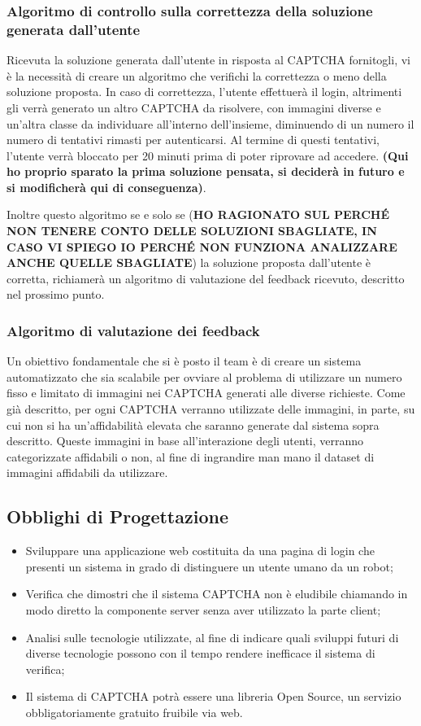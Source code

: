 \subsubsection{Algoritmo di controllo sulla correttezza della soluzione generata dall'utente}
Ricevuta la soluzione generata dall'utente in risposta al CAPTCHA fornitogli, vi è la necessità di creare un algoritmo che verifichi la correttezza o meno della soluzione proposta. In caso di correttezza, l'utente effettuerà il login, altrimenti gli verrà generato un altro CAPTCHA da risolvere, con immagini diverse e un'altra classe da individuare all'interno dell'insieme, diminuendo di un numero il numero di tentativi rimasti per autenticarsi. Al termine di questi tentativi, l'utente verrà bloccato per 20 minuti prima di poter riprovare ad accedere. \textbf{(Qui ho proprio sparato la prima soluzione pensata, si deciderà in futuro e si modificherà qui di conseguenza)}.

Inoltre questo algoritmo se e solo se (\textbf{HO RAGIONATO SUL PERCHÉ NON TENERE CONTO DELLE SOLUZIONI SBAGLIATE, IN CASO VI SPIEGO IO PERCHÉ NON FUNZIONA ANALIZZARE ANCHE QUELLE SBAGLIATE}) la soluzione proposta dall'utente è corretta, richiamerà un algoritmo di valutazione del feedback ricevuto, descritto nel prossimo punto.

\subsubsection{Algoritmo di valutazione dei feedback}
Un obiettivo fondamentale che si è posto il team è di creare un sistema automatizzato che sia scalabile per ovviare al problema di utilizzare un numero fisso e limitato di immagini nei CAPTCHA generati alle diverse richieste. Come già descritto, per ogni CAPTCHA verranno utilizzate delle immagini, in parte, su cui non si ha un'affidabilità elevata che saranno generate dal sistema sopra descritto. Queste immagini in base all'interazione degli utenti, verranno categorizzate affidabili o non, al fine di ingrandire man mano il dataset di immagini affidabili da utilizzare.

\subsection{Obblighi di Progettazione}
\begin{itemize}
    \item Sviluppare una applicazione web costituita da una pagina di login che presenti un sistema in grado di distinguere un utente umano da un robot;
    \item Verifica che dimostri che il sistema CAPTCHA non è eludibile chiamando in modo diretto la componente server senza aver utilizzato la parte client;
    \item Analisi sulle tecnologie utilizzate, al fine di indicare quali sviluppi futuri di diverse tecnologie possono con il tempo rendere inefficace il sistema di verifica;
    \item Il sistema di CAPTCHA potrà essere una libreria Open Source, un servizio obbligatoriamente gratuito fruibile via web.
\end{itemize}

